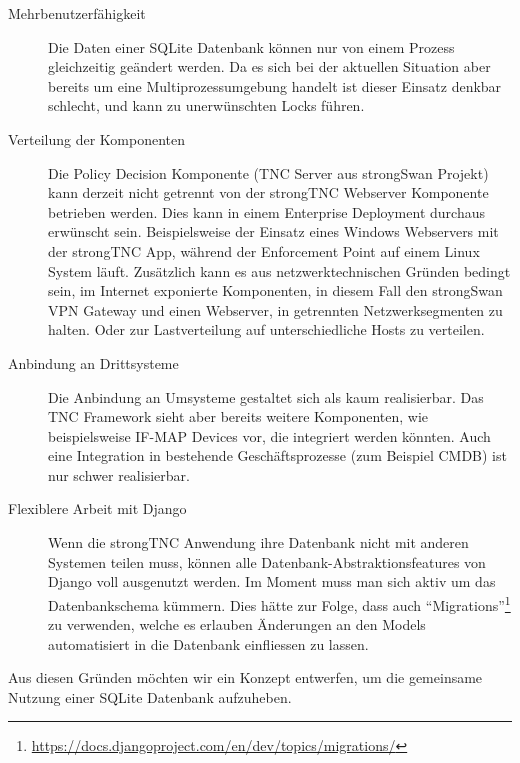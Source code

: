 \begin{description}
	\item[Mehrbenutzerfähigkeit] Die Daten einer SQLite Datenbank können nur von
	einem Prozess gleichzeitig geändert werden. Da es sich bei der aktuellen
	Situation aber bereits um eine Multiprozessumgebung handelt ist dieser Einsatz
	denkbar schlecht, und kann zu unerwünschten Locks führen.

	\item[Verteilung der Komponenten] Die Policy Decision Komponente (TNC Server
	aus strongSwan Projekt) kann derzeit nicht getrennt von der strongTNC Webserver
	Komponente betrieben werden. Dies kann in einem Enterprise Deployment
	durchaus erwünscht sein. Beispielsweise der Einsatz eines Windows Webservers
	mit der strongTNC App, während der Enforcement Point auf einem Linux System
	läuft. Zusätzlich kann es aus netzwerktechnischen Gründen bedingt sein, im
	Internet exponierte Komponenten, in diesem Fall den strongSwan VPN Gateway und
	einen Webserver, in getrennten Netzwerksegmenten zu halten. Oder zur
	Lastverteilung auf unterschiedliche Hosts zu verteilen.

	\item[Anbindung an Drittsysteme] Die Anbindung an Umsysteme gestaltet sich als
	kaum realisierbar. Das TNC Framework sieht aber bereits weitere Komponenten,
	wie beispielsweise IF-MAP Devices vor, die integriert werden könnten. Auch eine
	Integration in bestehende Geschäftsprozesse (zum Beispiel CMDB) ist nur schwer realisierbar.
	
	\item[Flexiblere Arbeit mit Django] Wenn die strongTNC Anwendung ihre Datenbank
	nicht mit anderen Systemen teilen muss, können alle
	Datenbank-Abstraktionsfeatures von Django voll ausgenutzt werden. Im Moment
	muss man sich aktiv um das Datenbankschema kümmern. Dies hätte zur Folge, dass
	auch
	\enquote{Migrations}\footnote{\url{https://docs.djangoproject.com/en/dev/topics/migrations/}} zu verwenden, welche es erlauben Änderungen an den Models automatisiert in die Datenbank einfliessen zu lassen.
	
\end{description} 

Aus diesen Gründen möchten wir ein Konzept entwerfen, um die gemeinsame Nutzung
einer SQLite Datenbank aufzuheben.

